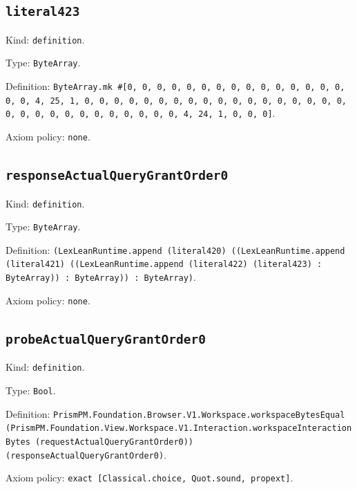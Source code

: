 \documentclass[11pt]{article}
\begin{document}
\subsection*{\texttt{literal423}}
\noindent Kind: \texttt{definition}.\par
\noindent Type: \texttt{ByteArray}.\par
\noindent Definition: \texttt{ByteArray.mk \#[0, 0, 0, 0, 0, 0, 0, 0, 0, 0, 0, 0, 0, 0, 0, 0, 0, 4, 25, 1, 0, 0, 0, 0, 0, 0, 0, 0, 0, 0, 0, 0, 0, 0, 0, 0, 0, 0, 0, 0, 0, 0, 0, 0, 0, 0, 0, 0, 0, 0, 4, 24, 1, 0, 0, 0]}.\par
\noindent Axiom policy: \texttt{none}.\par
\subsection*{\texttt{responseActualQueryGrantOrder0}}
\noindent Kind: \texttt{definition}.\par
\noindent Type: \texttt{ByteArray}.\par
\noindent Definition: \texttt{(LexLeanRuntime.append (literal420) ((LexLeanRuntime.append (literal421) ((LexLeanRuntime.append (literal422) (literal423) : ByteArray)) : ByteArray)) : ByteArray)}.\par
\noindent Axiom policy: \texttt{none}.\par
\subsection*{\texttt{probeActualQueryGrantOrder0}}
\noindent Kind: \texttt{definition}.\par
\noindent Type: \texttt{Bool}.\par
\noindent Definition: \texttt{PrismPM.Foundation.Browser.V1.Workspace.workspaceBytesEqual (PrismPM.Foundation.View.Workspace.V1.Interaction.workspaceInteractionBytes (requestActualQueryGrantOrder0)) (responseActualQueryGrantOrder0)}.\par
\noindent Axiom policy: \texttt{exact [Classical.choice, Quot.sound, propext]}.\par
\end{document}
